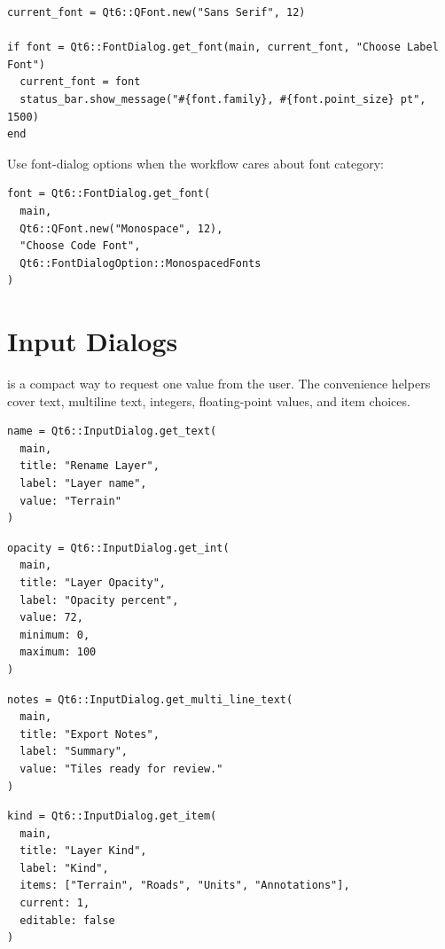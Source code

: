 
\begin{lstlisting}[style=crystal]
current_font = Qt6::QFont.new("Sans Serif", 12)

if font = Qt6::FontDialog.get_font(main, current_font, "Choose Label Font")
  current_font = font
  status_bar.show_message("#{font.family}, #{font.point_size} pt", 1500)
end
\end{lstlisting}

Use font-dialog options when the workflow cares about font category:

\begin{lstlisting}[style=crystal]
font = Qt6::FontDialog.get_font(
  main,
  Qt6::QFont.new("Monospace", 12),
  "Choose Code Font",
  Qt6::FontDialogOption::MonospacedFonts
)
\end{lstlisting}

\section{Input Dialogs}

 is a compact way to request one value from the user. The convenience helpers cover text, multiline text, integers, floating-point values, and item choices.

\begin{lstlisting}[style=crystal]
name = Qt6::InputDialog.get_text(
  main,
  title: "Rename Layer",
  label: "Layer name",
  value: "Terrain"
)
\end{lstlisting}

\begin{lstlisting}[style=crystal]
opacity = Qt6::InputDialog.get_int(
  main,
  title: "Layer Opacity",
  label: "Opacity percent",
  value: 72,
  minimum: 0,
  maximum: 100
)
\end{lstlisting}

\begin{lstlisting}[style=crystal]
notes = Qt6::InputDialog.get_multi_line_text(
  main,
  title: "Export Notes",
  label: "Summary",
  value: "Tiles ready for review."
)
\end{lstlisting}

\begin{lstlisting}[style=crystal]
kind = Qt6::InputDialog.get_item(
  main,
  title: "Layer Kind",
  label: "Kind",
  items: ["Terrain", "Roads", "Units", "Annotations"],
  current: 1,
  editable: false
)
\end{lstlisting}

